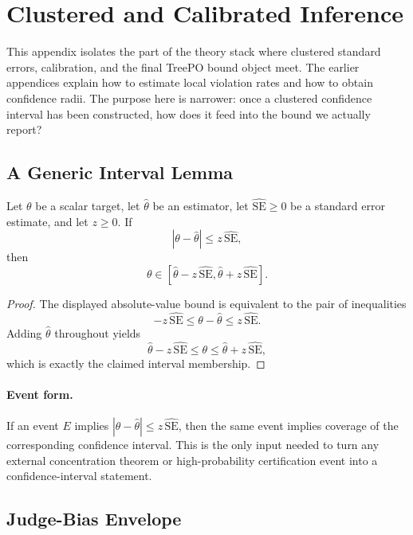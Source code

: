 \section{Clustered and Calibrated Inference}
\label{app:clustered-inference}

This appendix isolates the part of the theory stack where clustered standard
errors, calibration, and the final TreePO bound object meet. The earlier
appendices explain how to estimate local violation rates and how to obtain
confidence radii. The purpose here is narrower: once a clustered confidence
interval has been constructed, how does it feed into the bound we actually
report?

\subsection{A Generic Interval Lemma}

\begin{lemma}
\label{lem:clustered-ci-membership}
Let $\theta$ be a scalar target, let $\widehat{\theta}$ be an estimator, let
$\widehat{\mathrm{SE}}\ge 0$ be a standard error estimate, and let $z\ge 0$.
If
\[
|\theta-\widehat{\theta}| \le z\,\widehat{\mathrm{SE}},
\]
then
\[
\theta \in
\left[
\widehat{\theta}-z\,\widehat{\mathrm{SE}},
\widehat{\theta}+z\,\widehat{\mathrm{SE}}
\right].
\]
\end{lemma}

\begin{proof}
The displayed absolute-value bound is equivalent to the pair of inequalities
\[
-z\,\widehat{\mathrm{SE}}
\le
\theta-\widehat{\theta}
\le
z\,\widehat{\mathrm{SE}}.
\]
Adding $\widehat{\theta}$ throughout yields
\[
\widehat{\theta}-z\,\widehat{\mathrm{SE}}
\le
\theta
\le
\widehat{\theta}+z\,\widehat{\mathrm{SE}},
\]
which is exactly the claimed interval membership.
\end{proof}

\paragraph{Event form.}
If an event $E$ implies
$|\theta-\widehat{\theta}| \le z\,\widehat{\mathrm{SE}}$,
then the same event implies coverage of the corresponding confidence interval.
This is the only input needed to turn any external concentration theorem or
high-probability certification event into a confidence-interval statement.

\subsection{Judge-Bias Envelope}

